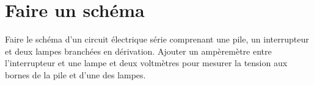 \newpage


\section{Faire un schéma}
 
 \begin{questions}
 	\question Faire le schéma d'un circuit électrique série comprenant une pile, un interrupteur et deux lampes branchées en dérivation. Ajouter un ampèremètre entre l'interrupteur et une lampe et deux voltmètres pour mesurer la tension aux bornes de la pile et d'une des lampes.
 	
 	\makeemptybox{10cm}

 \end{questions}